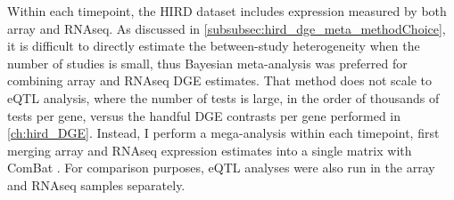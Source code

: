 %
%
%
%
Within each timepoint, the \gls{HIRD} dataset includes expression measured by both array and \gls{RNAseq}.
As discussed in \cref{subsubsec:hird_dge_meta_methodChoice}, it is difficult to directly estimate the between-study heterogeneity when the number of studies is small, 
thus Bayesian meta-analysis was preferred for combining array and \gls{RNAseq} \gls{DGE} estimates.
That method does not scale to \gls{eQTL} analysis, where the number of tests is large, in the order of thousands of tests per gene, versus the handful \gls{DGE} contrasts per gene performed in \cref{ch:hird_DGE}.
Instead, I perform a mega-analysis within each timepoint, first merging array and \gls{RNAseq} expression estimates into a single matrix with ComBat \autocite{johnson2007AdjustingBatchEffects}.
For comparison purposes, \gls{eQTL} analyses were also run in the array and \gls{RNAseq} samples separately.

